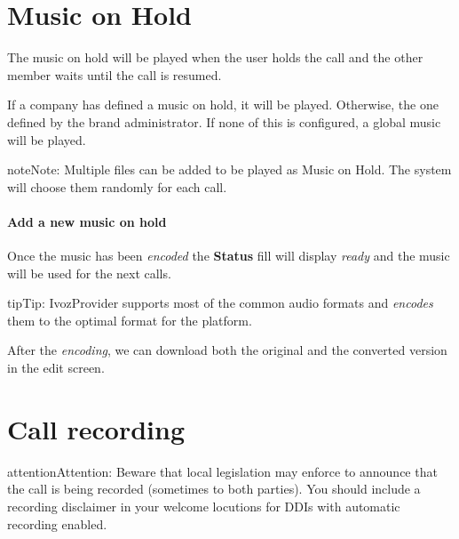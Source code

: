 \documentclass[letterpaper,10pt,english]{sphinxmanual}
\begin{document}
\section{Music on Hold}
\label{company/music_on_hold:music-on-hold}\label{company/music_on_hold::doc}\label{company/music_on_hold:musiconhold}
The music on hold will be played when the user holds the call and the other
member waits until the call is resumed.

If a company has defined a music on hold, it will be played. Otherwise, the
one defined by the brand administrator. If none of this is configured, a global
music will be played.

\begin{notice}{note}{Note:}
Multiple files can be added to be played as Music on Hold. The system
will choose them randomly for each call.
\end{notice}
\paragraph{Add a new music on hold}

\noindent{}

Once the music has been \emph{encoded} the \textbf{Status} fill will display \emph{ready} and
the music will be used for the next calls.

\noindent{}

\begin{notice}{tip}{Tip:}
IvozProvider supports most of the common audio formats and \emph{encodes}
them to the optimal format for the platform.
\end{notice}

After the \emph{encoding}, we can download both the original and the converted
version in the edit screen.

\noindent{}


\section{Call recording}
\label{company/call_recording:call-recording}\label{company/call_recording::doc}\label{company/call_recording:call-recordings}
\begin{notice}{attention}{Attention:}
Beware that local legislation may enforce to announce that the
call is being recorded (sometimes to both parties). You should include
a recording disclaimer in your welcome locutions for DDIs with automatic
recording enabled.
\end{notice}
\end{document}
